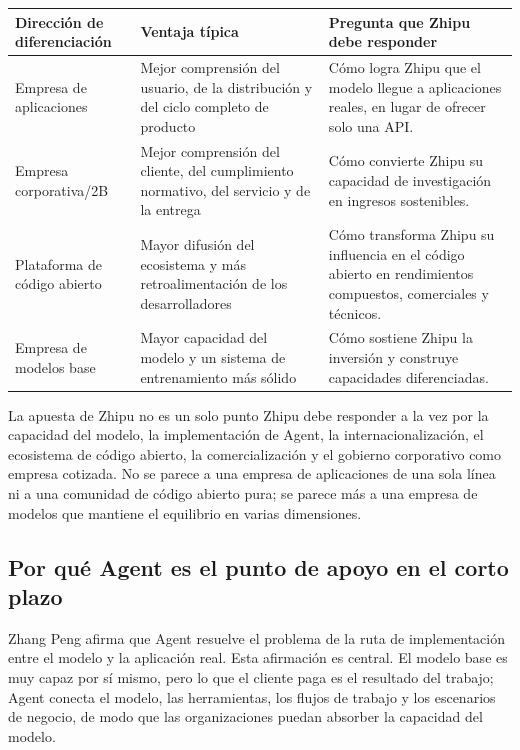 \documentclass[a4paper]{article}
\begin{document}
\begin{longtable}{p{}p{}p{}}
\toprule
Dirección de diferenciación & Ventaja típica & Pregunta que Zhipu debe responder \\
\midrule
Empresa de aplicaciones & Mejor comprensión del usuario, de la distribución y del ciclo completo de producto & Cómo logra Zhipu que el modelo llegue a aplicaciones reales, en lugar de ofrecer solo una API. \\
Empresa corporativa/2B & Mejor comprensión del cliente, del cumplimiento normativo, del servicio y de la entrega & Cómo convierte Zhipu su capacidad de investigación en ingresos sostenibles. \\
Plataforma de código abierto & Mayor difusión del ecosistema y más retroalimentación de los desarrolladores & Cómo transforma Zhipu su influencia en el código abierto en rendimientos compuestos, comerciales y técnicos. \\
Empresa de modelos base & Mayor capacidad del modelo y un sistema de entrenamiento más sólido & Cómo sostiene Zhipu la inversión y construye capacidades diferenciadas. \\
\bottomrule
\end{longtable}

\begin{importantbox}{La apuesta de Zhipu no es un solo punto}
Zhipu debe responder a la vez por la capacidad del modelo, la implementación de Agent, la internacionalización, el ecosistema de código abierto, la comercialización y el gobierno corporativo como empresa cotizada. No se parece a una empresa de aplicaciones de una sola línea ni a una comunidad de código abierto pura; se parece más a una empresa de modelos que mantiene el equilibrio en varias dimensiones.
\end{importantbox}

\subsection{Por qué Agent es el punto de apoyo en el corto plazo}

Zhang Peng afirma que Agent resuelve el problema de la ruta de implementación entre el modelo y la aplicación real. Esta afirmación es central. El modelo base es muy capaz por sí mismo, pero lo que el cliente paga es el resultado del trabajo; Agent conecta el modelo, las herramientas, los flujos de trabajo y los escenarios de negocio, de modo que las organizaciones puedan absorber la capacidad del modelo.
\end{document}
